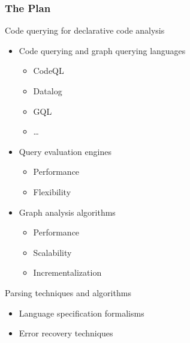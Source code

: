 \documentclass[xcolor=table,aspectratio=169]{beamer}
\begin{document}
\begin{frame}[fragile]
  \frametitle{The Plan}
  \begin{minipage}[t]{0.48\textwidth}
    Code querying for declarative code analysis
    \begin{itemize}
      \item Code querying and graph querying languages
      \begin{itemize}        
        \item CodeQL
        \item Datalog
        \item GQL
        \item \ldots
      \end{itemize}
      \item Query evaluation engines
      \begin{itemize}        
        \item Performance 
        \item Flexibility        
      \end{itemize}
      \item Graph analysis algorithms
      \begin{itemize}        
        \item Performance 
        \item Scalability
        \item Incrementalization
      \end{itemize}
    \end{itemize}
  \end{minipage}
  \pause
  \begin{minipage}[t]{0.48\textwidth}
    Parsing techniques and algorithms
    \begin{itemize}
      \item Language specification formalisms
      \item Error recovery techniques

\end{itemize}
\end{minipage}
\end{frame}
\end{document}
